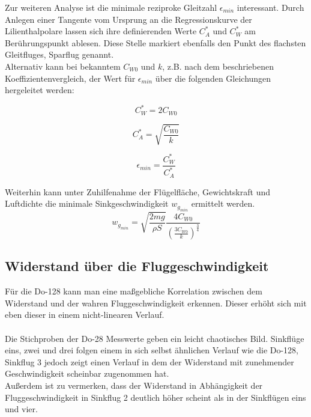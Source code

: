 \vspace{5mm}
\noindent Zur weiteren Analyse ist die minimale reziproke Gleitzahl $\epsilon_{min}$ interessant. Durch Anlegen einer Tangente vom Ursprung an die Regressionskurve der Lilienthalpolare lassen sich ihre definierenden Werte $C_{A}^{*}$ und $C_{W}^{*}$ am Berührungspunkt ablesen. Diese Stelle markiert ebenfalls den Punkt des flachsten Gleitfluges, Sparflug genannt.\\
Alternativ kann bei bekanntem $C_{W0}$ und $k$, z.B. nach dem beschriebenen Koeffizientenvergleich, der Wert für $\epsilon_{min}$ über die folgenden Gleichungen hergeleitet werden:

\begin{equation*}
C_{W}^{*} = 2 C_{W0}
\end{equation*}

\begin{equation*}
C_{A}^{*} = \sqrt{\frac{C_{W0}}{k}}
\end{equation*}

\begin{equation*}
\epsilon_{min} = \frac{C_{W}^{*}}{C_{A}^{*}}
\end{equation*}

\vspace{5mm}
\noindent Weiterhin kann unter Zuhilfenahme der Flügelfläche, Gewichtskraft und Luftdichte die minimale Sinkgeschwindigkeit $w_{g_{min}}$ ermittelt werden.\\

\begin{equation*}
w_{g_{min}} = \sqrt{\frac{2mg}{\rho S}} \frac{4C_{W0}}{\left( \frac{3C_{W0}}{k}\right)^{\frac{3}{4}}}
\end{equation*}

\vspace{10mm}
\subsection{Widerstand über die Fluggeschwindigkeit}
Für die Do-128 kann man eine maßgebliche Korrelation zwischen dem Widerstand und der wahren Fluggeschwindigkeit erkennen. Dieser erhöht sich mit eben dieser in einem  nicht-linearen Verlauf.\\\\
Die Stichproben der Do-28 Messwerte geben ein leicht chaotisches Bild. Sinkflüge eins, zwei und drei folgen einem in sich selbst ähnlichen Verlauf wie die Do-128, Sinkflug 3 jedoch zeigt einen Verlauf in dem der Widerstand mit zunehmender Geschwindigkeit scheinbar zugenommen hat.\\
Außerdem ist zu vermerken, dass der Widerstand in Abhängigkeit der Fluggeschwindigkeit in Sinkflug 2 deutlich höher scheint als in der Sinkflügen eins und vier.\\\\

